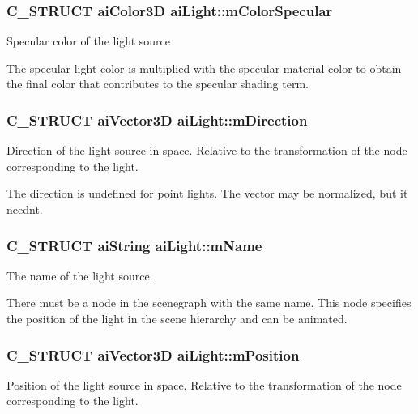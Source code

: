 \subsubsection[{\texorpdfstring{m\+Color\+Specular}{mColorSpecular}}]{\setlength{\rightskip}{0pt plus 5cm}C\+\_\+\+S\+T\+R\+U\+CT {\bf ai\+Color3D} ai\+Light\+::m\+Color\+Specular}\hypertarget{structai_light_aa79ae6ad6a10f0cb9c740e23b6bb01bf}{}\label{structai_light_aa79ae6ad6a10f0cb9c740e23b6bb01bf}
Specular color of the light source

The specular light color is multiplied with the specular material color to obtain the final color that contributes to the specular shading term. 
\subsubsection[{\texorpdfstring{m\+Direction}{mDirection}}]{\setlength{\rightskip}{0pt plus 5cm}C\+\_\+\+S\+T\+R\+U\+CT {\bf ai\+Vector3D} ai\+Light\+::m\+Direction}\hypertarget{structai_light_af3776d5e4e6065cb6dd7e10dc656dada}{}\label{structai_light_af3776d5e4e6065cb6dd7e10dc656dada}
Direction of the light source in space. Relative to the transformation of the node corresponding to the light.

The direction is undefined for point lights. The vector may be normalized, but it needn\textquotesingle{}t. 
\subsubsection[{\texorpdfstring{m\+Name}{mName}}]{\setlength{\rightskip}{0pt plus 5cm}C\+\_\+\+S\+T\+R\+U\+CT {\bf ai\+String} ai\+Light\+::m\+Name}\hypertarget{structai_light_a92806413f16230728b04e5f379fd00c0}{}\label{structai_light_a92806413f16230728b04e5f379fd00c0}
The name of the light source.

There must be a node in the scenegraph with the same name. This node specifies the position of the light in the scene hierarchy and can be animated. 
\subsubsection[{\texorpdfstring{m\+Position}{mPosition}}]{\setlength{\rightskip}{0pt plus 5cm}C\+\_\+\+S\+T\+R\+U\+CT {\bf ai\+Vector3D} ai\+Light\+::m\+Position}\hypertarget{structai_light_a5daf9c9ad2613603b847a527123611f0}{}\label{structai_light_a5daf9c9ad2613603b847a527123611f0}
Position of the light source in space. Relative to the transformation of the node corresponding to the light.

